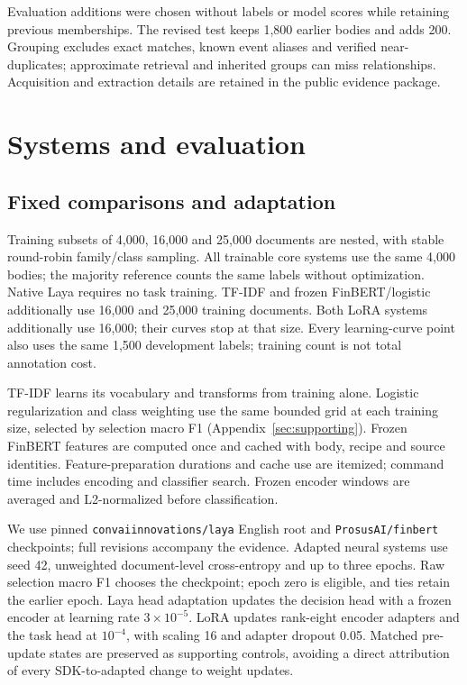 \documentclass[11pt,a4paper]{article}
\begin{document}
Evaluation additions were chosen without labels or model scores while retaining
previous memberships. The revised test keeps 1,800 earlier bodies and adds 200.
Grouping excludes exact matches, known event aliases and verified near-duplicates;
approximate retrieval and inherited groups can miss relationships. Acquisition
and extraction details are retained in the public evidence package.



\section{Systems and evaluation}
\label{sec:methods}
\subsection{Fixed comparisons and adaptation}
Training subsets of 4,000, 16,000 and 25,000 documents are nested, with stable
round-robin family/class sampling. All trainable core systems use the same
4,000 bodies; the majority reference counts the same labels without optimization. Native Laya
requires no task training. TF-IDF and frozen FinBERT/logistic additionally use
16,000 and 25,000 training documents. Both LoRA systems additionally use 16,000;
their curves stop at that size. Every learning-curve point also
uses the same 1,500 development labels; training count is not total annotation cost.

TF-IDF learns its vocabulary and transforms from training alone. Logistic
regularization and class weighting use the same bounded grid at each training
size, selected by selection macro F1 (Appendix~\ref{sec:supporting}).
Frozen FinBERT features are computed once and cached with
body, recipe and source identities. Feature-preparation durations and cache use
are itemized; command time includes encoding and classifier search. Frozen encoder windows are averaged and
L2-normalized before classification.

We use pinned \texttt{convaiinnovations/laya} English root and
\texttt{ProsusAI/finbert} checkpoints; full revisions accompany the evidence.
Adapted neural systems use seed 42, unweighted document-level cross-entropy and
up to three epochs. Raw selection macro F1 chooses the checkpoint; epoch zero
is eligible, and ties retain the earlier epoch. Laya head adaptation updates
the decision head with a frozen encoder at learning rate $3\times10^{-5}$.
LoRA updates rank-eight encoder adapters and the task head at $10^{-4}$, with
scaling 16 and adapter dropout 0.05. Matched pre-update states are preserved
as supporting controls, avoiding a direct attribution of every SDK-to-adapted
change to weight updates.
\end{document}
